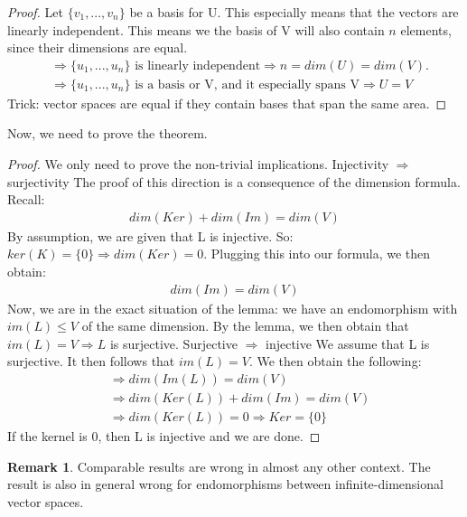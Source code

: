 \documentclass[a4paper, 12pt]{article}
\theoremstyle{definition}
\theoremstyle{definition}
\theoremstyle{definition}
\theoremstyle{definition}
\newtheorem{rmk}{Remark}[section]
\begin{document}
{\begin{proof}
	Let $\{v_1,...,v_n \}$ be a basis for U. This especially means that the vectors are linearly independent. This means we the basis of V will also contain $n$ elements, since their dimensions are equal. 
	\begin{align*}
		& \Rightarrow \{ u_1, ..., u_n\} \mbox{ is linearly independent} \Rightarrow n = dim(U) = dim(V). \\
		& \Rightarrow \{ u_1, ..., u_n \} \mbox{ is a basis or V, and it especially spans V} \Rightarrow U = V
	\end{align*}
	Trick: vector spaces are equal if they contain bases that span the same area. 
\end{proof}
Now, we need to prove the theorem.
\begin{proof}
	We only need to prove the non-trivial implications. 
	\newline
	[ $\Rightarrow$ ] Injectivity $\Rightarrow$ surjectivity \newline 
	The proof of this direction is a consequence of the dimension formula. Recall: 
	\begin{align*}
		dim(Ker) + dim(Im) = dim(V)
	\end{align*}
	By assumption, we are given that L is injective. So: $ker(K) = \{ 0 \} \Rightarrow dim(Ker) =0$. 
	Plugging this into our formula, we then obtain: 
	\begin{align*}
		dim(Im) = dim(V)
	\end{align*}
	Now, we are in the exact situation of the lemma: we have an endomorphism with $im(L) \leq V$ of the same dimension. By the lemma, we then obtain that $im(L) = V \Rightarrow L$ is surjective. 
	\newline
	\newline
	[ $\Rightarrow$ ] Surjective $\Rightarrow$ injective \newline
	We assume that L is surjective. It then follows that $im(L) = V$. We then obtain the following:
	\begin{align*}
		& \Rightarrow dim(Im(L)) = dim(V) \\
		& \Rightarrow dim(Ker(L)) + dim(Im) = dim(V) \\
		& \Rightarrow dim(Ker(L)) = 0 \Rightarrow Ker = \{ 0 \} 
	\end{align*}
	If the kernel is 0, then L is injective and we are done. 
\end{proof}

\begin{rmk}
	Comparable results are wrong in almost any other context. The result is also in general wrong for endomorphisms between infinite-dimensional vector spaces. 
\end{rmk}

}
\end{document}
